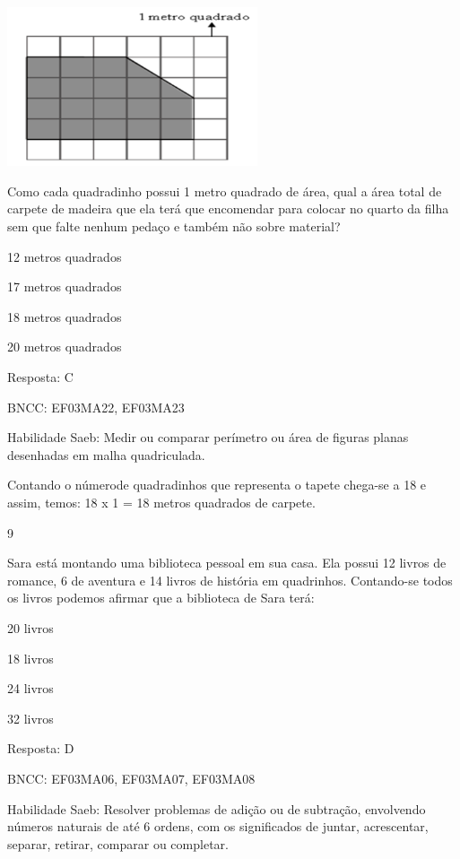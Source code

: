 \begin{escolha}
{\begin{escolha}
{\includegraphics[width=2.90385in,height=1.84662in]{media/image123.png}

Como cada quadradinho possui 1 metro quadrado de área, qual a área total
de carpete de madeira que ela terá que encomendar para colocar no quarto
da filha sem que falte nenhum pedaço e também não sobre material?

\begin{escolha}
\item
  12 metros quadrados
\item
  17 metros quadrados
\item
  18 metros quadrados
\item
  20 metros quadrados
\end{escolha}

Resposta: C

BNCC: EF03MA22, EF03MA23

Habilidade Saeb: Medir ou comparar perímetro ou área de figuras planas
desenhadas em malha quadriculada.

Contando o númerode quadradinhos que representa o tapete chega-se a 18 e
assim, temos: 18 x 1 = 18 metros quadrados de carpete.

\num{9}

Sara está montando uma biblioteca pessoal em sua casa. Ela possui 12
livros de romance, 6 de aventura e 14 livros de história em quadrinhos.
Contando-se todos os livros podemos afirmar que a biblioteca de Sara
terá:

\begin{escolha}
\item
  20 livros
\item
  18 livros
\item
  24 livros
\item
  32 livros
\end{escolha}

Resposta: D

BNCC: EF03MA06, EF03MA07, EF03MA08

Habilidade Saeb: Resolver problemas de adição ou de subtração,
envolvendo números naturais de até 6 ordens, com os significados de
juntar, acrescentar, separar, retirar, comparar ou completar.

}
\end{escolha}}
\end{escolha}
